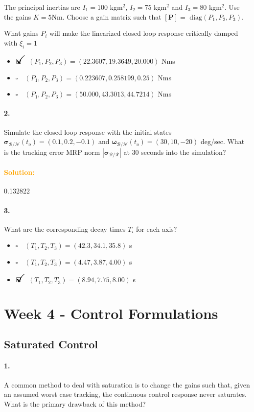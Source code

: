 \documentclass[12pt, a4paper]{article}
\newcommand{\ans}{\item[]$\rlap{\LARGE{\checkmark}}\square\quad$}
\newcommand{\noans}{\item[]$\square\quad$}
\begin{document}
The principal inertias are $I_{1} = 100$ kgm$^{2}$, $I_{2} = 75$ kgm$^{2}$ and $I_{3} = 80$ kgm$^{2}$. Use the gains $K = 5$Nm. Choose a gain matrix such that $[\bm{P}] = \text{ diag}(P_{1},P_{2},P_{3})$. \medskip

What gains $P_{i}$ will make the linearized closed loop response critically damped with $\xi_{i} = 1$

\begin{itemize}
\ans $(P_1, P_2, P_3) = (22.3607, 19.3649, 20.000)$ Nms 
\noans $(P_1, P_2, P_3) = (0.223607, 0.258199, 0.25)$ Nms
\noans $(P_1, P_2, P_3) = (50.000, 43.3013, 44.7214)$ Nms
\end{itemize}

\paragraph{2.}
Simulate the closed loop response with the initial states $\bm{\sigma}_{\mathcal{B}/\mathcal{N}}(t_{o}) = (0.1,0.2,-0.1)$  and $\bm{\omega}_{\mathcal{B}/\mathcal{N}}(t_{o}) = (30,10,-20)$ deg/sec. What is the tracking error MRP norm $|\bm{\sigma}_{\mathcal{B}/\mathcal{R}}|$ at 30 seconds into the simulation?

\paragraph{\textcolor{orange}{Solution:}}0.132822

\paragraph{3.}
What are the corresponding decay times $T_{i}$ for each
axis?

\begin{itemize}
\noans $(T_1, T_2, T_3) = (42.3, 34.1, 35.8)$ s 
\noans $(T_1, T_2, T_3) = (4.47, 3.87, 4.00)$ s
\ans $(T_1, T_2, T_3) = (8.94, 7.75, 8.00)$ s
\end{itemize}

\newpage
\section{Week 4 - Control Formulations}
\subsection{Saturated Control}
\paragraph{1.}
A common method to deal with saturation is to change the gains such that, given an assumed worst case tracking, the continuous control response never saturates.  What is the primary drawback of this method?
\end{document}

